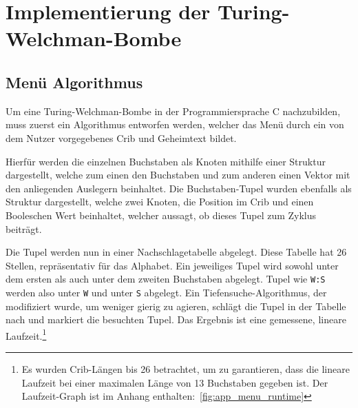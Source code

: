 \chapter{Implementierung der Turing-Welchman-Bombe}\label{ch:impl_bombe}


\section{Menü Algorithmus}\label{sec:cycle-finding-algorithm}
Um eine Turing-Welchman-Bombe in der Programmiersprache C nachzubilden, muss zuerst ein Algorithmus entworfen werden, welcher das Menü durch ein von dem Nutzer vorgegebenes Crib und 
Geheimtext bildet.

Hierfür werden die einzelnen Buchstaben als Knoten mithilfe einer Struktur dargestellt, welche zum einen den Buchstaben und zum anderen einen Vektor mit den anliegenden Auslegern beinhaltet.
Die Buchstaben-Tupel wurden ebenfalls als Struktur dargestellt, welche zwei Knoten, die Position im Crib und einen Booleschen Wert beinhaltet, welcher aussagt, ob dieses Tupel zum Zyklus beiträgt.


\noindent

Die Tupel werden nun in einer \glqq Nachschlagetabelle\grqq{} abgelegt.
Diese Tabelle hat 26 Stellen, repräsentativ für das Alphabet.
Ein jeweiliges Tupel wird sowohl unter dem ersten als auch unter dem zweiten Buchstaben abgelegt. 
Tupel wie \texttt{W:S} werden also unter \texttt{W} und unter \texttt{S} abgelegt.
Ein Tiefensuche-Algorithmus, der modifiziert wurde, um weniger \glqq gierig\grqq{} zu agieren, schlägt die Tupel in der Tabelle nach und markiert die besuchten Tupel.
Das Ergebnis ist eine gemessene, lineare Laufzeit.\footnote{Es wurden Crib-Längen bis 26 betrachtet, um zu garantieren, dass die lineare Laufzeit bei einer maximalen Länge von 13 Buchstaben gegeben ist.
Der Laufzeit-Graph ist im Anhang enthalten:~\cref{fig:app_menu_runtime}}

